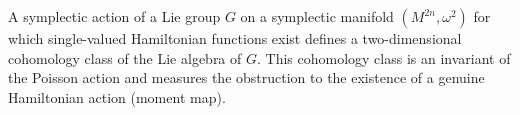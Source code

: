 A symplectic action of a Lie group $G$ on a symplectic manifold $(M^{2n}, \omega^2)$ for which single-valued Hamiltonian functions exist defines a two-dimensional cohomology class of the Lie algebra of $G$. This cohomology class is an invariant of the Poisson action and measures the obstruction to the existence of a genuine Hamiltonian action (moment map).
